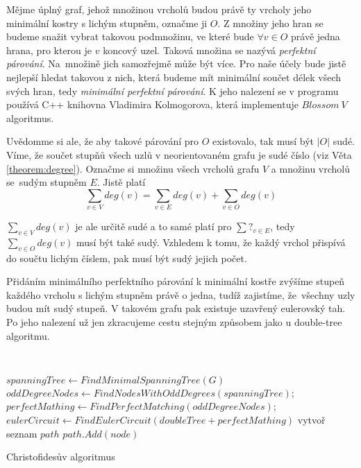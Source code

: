 \documentclass[
  biblatex,
  figures=false,
  glossaries,
  index
]{kidiplom}
\begin{document}
Mějme úplný graf, jehož množinou vrcholů budou právě ty vrcholy jeho minimální kostry s lichým stupněm, označme ji $O$. Z množiny jeho hran se budeme snažit vybrat takovou podmnožinu, ve které bude $\forall v \in O$ právě jedna hrana, pro kterou je $v$ koncový uzel. Taková množina se nazývá \textit{perfektní párování}. Na~\mbox{množině} jich samozřejmě může být více. Pro naše účely bude jistě nejlepší hledat takovou z nich, která budeme mít minimální součet délek všech svých hran, tedy \textit{minimální perfektní párování}. K jeho nalezení se v programu používá C++ knihovna Vladimira Kolmogorova, která implementuje $Blossom~V$ algoritmus.

Uvědomme si ale, že aby takové párování pro $O$ existovalo, tak musí být $|O|$ sudé. Víme, že součet stupňů všech uzlů v neorientovaném grafu je sudé číslo (viz Věta \ref{theorem:degree}). Označme si množinu všech vrcholů grafu $V$ a množinu vrcholů se~sudým stupněm $E$. Jistě platí
$$
\sum_{v \in V} deg(v) = \sum_{v \in E} deg(v) + \sum_{v \in O} deg(v)
$$

$\sum_{v \in V} deg(v)$ je ale určitě sudé a to samé platí pro $\sum?_{v \in E}$, tedy $\sum_{v \in O} deg(v)$ musí být také sudý. Vzhledem k tomu, že každý vrchol přispívá do součtu lichým číslem, pak musí být sudý jejich počet.

Přidáním minimálního perfektního párování k minimální kostře zvýšíme stupeň každého vrcholu s lichým stupněm právě o jedna, tudíž zajistíme, že~všechny uzly budou mít sudý stupeň. V takovém grafu pak existuje uzavřený eulerovský tah. Po jeho nalezení už jen zkracujeme cestu stejným způsobem jako u double-tree algoritmu.\leavevmode\newline

{\SetAlgoNoLine\
\begin{algorithm}[H]
$spanningTree \leftarrow FindMinimalSpanningTree(G)$\;
$oddDegreeNodes \leftarrow FindNodesWithOddDegrees(spanningTree)$;
$perfectMathing \leftarrow FindPerfectMatching(oddDegreeNodes)$;
$eulerCircuit \leftarrow FindEulerCircuit(doubleTree + perfectMathing)$\;
vytvoř seznam $path$\;
{
	{
		$path.Add(node)$\;
	}
}
\caption{Christofidesův algoritmus}
\end{algorithm}}\leavevmode\newline
\end{document}
